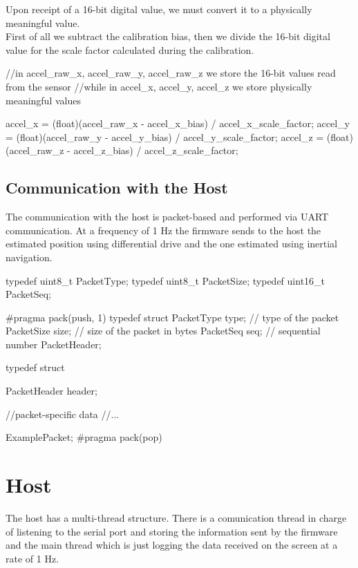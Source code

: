 Upon receipt of a 16-bit digital value, we must convert it to a physically meaningful value.\\
First of all we subtract the calibration bias, then we divide the 16-bit digital value for the scale factor calculated during the calibration.
\begin{ccode}
	//in accel_raw_x, accel_raw_y, accel_raw_z we store the 16-bit values read from the sensor
	//while in accel_x, accel_y, accel_z we store physically meaningful values

	accel_x = (float)(accel_raw_x - accel_x_bias) / accel_x_scale_factor;
	accel_y = (float)(accel_raw_y - accel_y_bias) / accel_y_scale_factor;
	accel_z = (float)(accel_raw_z - accel_z_bias) / accel_z_scale_factor;
\end{ccode}


\subsection{Communication with the Host}

The communication with the host is packet-based and performed via UART communication. At a frequency of 1 Hz the firmware sends to the host the estimated position using differential drive and the one estimated using inertial navigation.\\
\begin{ccode}
	typedef uint8_t PacketType;
	typedef uint8_t PacketSize;
	typedef uint16_t PacketSeq;   

	#pragma pack(push, 1)
	typedef struct {
		PacketType type; // type of the packet
		PacketSize size; // size of the packet in bytes
		PacketSeq seq;		// sequential number
	} PacketHeader;

	typedef struct {
		PacketHeader header;
		
		//packet-specific data
		//...
	} ExamplePacket;
	#pragma pack(pop)
\end{ccode}

\section{Host}

The host has a multi-thread structure. There is a comunication thread in charge of listening to the serial port and storing the information sent by the firmware and the main thread which is just logging the data received on the screen at a rate of 1 Hz.\\


